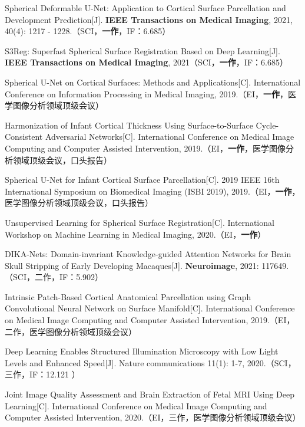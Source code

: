 \cleardoublepage
{}


\noindent [1] Spherical Deformable U-Net: Application to Cortical Surface Parcellation and Development Prediction[J]. \textbf{IEEE Transactions on Medical Imaging}, 2021, 40(4): 1217 - 1228.（SCI，\textbf{一作}，IF：6.685）

\noindent [2] S3Reg: Superfast Spherical Surface Registration Based on Deep Learning[J]. \textbf{IEEE Transactions on Medical Imaging}, 2021（SCI，\textbf{一作}，IF：6.685）

\noindent [3] Spherical U-Net on Cortical Surfaces: Methods and Applications[C]. International Conference on Information Processing in Medical Imaging, 2019.（EI，\textbf{一作}，医学图像分析领域顶级会议）

\noindent [4] Harmonization of Infant Cortical Thickness Using Surface-to-Surface Cycle-Consistent Adversarial Networks[C]. International Conference on Medical Image Computing and Computer Assisted Intervention, 2019.（EI，\textbf{一作}，医学图像分析领域顶级会议，口头报告）

\noindent [5] Spherical U-Net for Infant Cortical Surface Parcellation[C]. 2019 IEEE 16th International Symposium on Biomedical Imaging (ISBI 2019), 2019.（EI，\textbf{一作}，医学图像分析领域顶级会议，口头报告）

\noindent [6] Unsupervised Learning for Spherical Surface Registration[C]. International Workshop on Machine Learning in Medical Imaging, 2020.（EI，\textbf{一作}）

\noindent [7] DIKA-Nets: Domain-invariant Knowledge-guided Attention Networks for Brain Skull Stripping of Early Developing Macaques[J]. \textbf{Neuroimage}, 2021: 117649.（SCI，二作，IF：5.902） 

\noindent [8] Intrinsic Patch-Based Cortical Anatomical Parcellation using Graph Convolutional Neural Network on Surface Manifold[C]. International Conference on Medical Image Computing and Computer Assisted Intervention, 2019.（EI，二作，医学图像分析领域顶级会议）

\noindent [9] Deep Learning Enables Structured Illumination Microscopy with Low Light Levels and Enhanced Speed[J]. Nature communications 11(1): 1-7, 2020.（SCI，三作，IF：12.121 ）

\noindent [10] Joint Image Quality Assessment and Brain Extraction of Fetal MRI Using Deep Learning[C]. International Conference on Medical Image Computing and Computer Assisted Intervention, 2020.（EI，三作，医学图像分析领域顶级会议）

